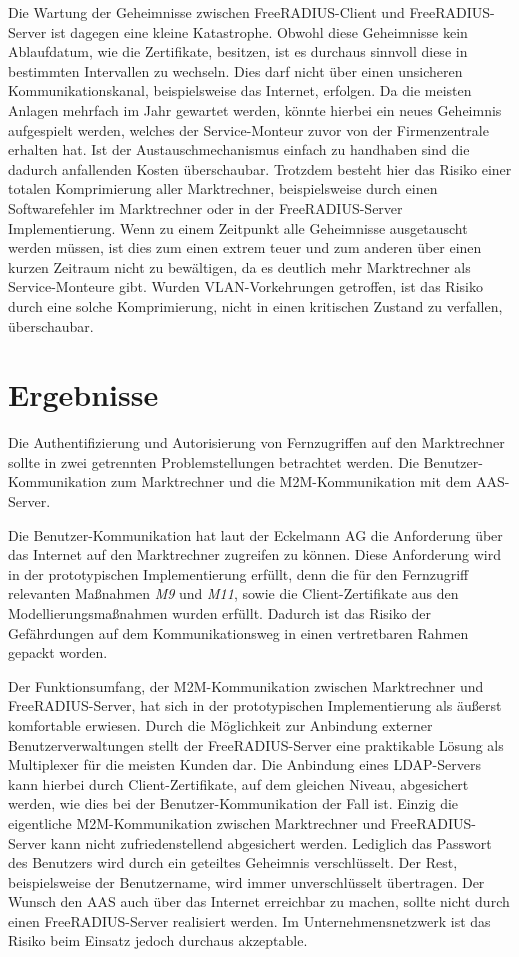 \documentclass[11pt,a4paper]{report}
\begin{document}
Die Wartung der Geheimnisse zwischen FreeRADIUS-Client und FreeRADIUS-Server ist dagegen eine kleine Katastrophe. Obwohl diese Geheimnisse kein Ablaufdatum, wie die Zertifikate, besitzen, ist es durchaus sinnvoll diese in bestimmten Intervallen zu wechseln. Dies darf nicht über einen unsicheren Kommunikationskanal, beispielsweise das Internet, erfolgen. Da die meisten Anlagen mehrfach im Jahr gewartet werden, könnte hierbei ein neues Geheimnis aufgespielt werden, welches der Service-Monteur zuvor von der Firmenzentrale erhalten hat. Ist der Austauschmechanismus einfach zu handhaben sind die dadurch anfallenden Kosten überschaubar. Trotzdem besteht hier das Risiko einer totalen Komprimierung aller Marktrechner, beispielsweise durch einen Softwarefehler im Marktrechner oder in der FreeRADIUS-Server Implementierung. Wenn zu einem Zeitpunkt alle Geheimnisse ausgetauscht werden müssen, ist dies zum einen extrem teuer und zum anderen über einen kurzen Zeitraum nicht zu bewältigen, da es deutlich mehr Marktrechner als Service-Monteure gibt. Wurden VLAN-Vorkehrungen getroffen, ist das Risiko durch eine solche Komprimierung, nicht in einen kritischen Zustand zu verfallen, überschaubar.

\section{Ergebnisse}

Die Authentifizierung und Autorisierung von Fernzugriffen auf den Marktrechner sollte in zwei getrennten Problemstellungen betrachtet werden. Die Benutzer-Kommunikation zum Marktrechner und die M2M-Kommunikation mit dem AAS-Server. 

Die Benutzer-Kommunikation hat laut der Eckelmann AG die Anforderung über das Internet auf den Marktrechner zugreifen zu können. Diese Anforderung wird in der prototypischen Implementierung erfüllt, denn die für den Fernzugriff relevanten Maßnahmen \textit{M9} und \textit{M11}, sowie die Client-Zertifikate aus den Modellierungsmaßnahmen wurden erfüllt. Dadurch ist das Risiko der Gefährdungen auf dem Kommunikationsweg in einen vertretbaren Rahmen gepackt worden.

Der Funktionsumfang, der M2M-Kommunikation zwischen Marktrechner und FreeRADIUS-Server, hat sich in der prototypischen Implementierung als äußerst komfortable erwiesen. Durch die Möglichkeit zur Anbindung externer Benutzerverwaltungen stellt der FreeRADIUS-Server eine praktikable Lösung als Multiplexer für die meisten Kunden dar. Die Anbindung eines LDAP-Servers kann hierbei durch Client-Zertifikate, auf dem gleichen Niveau, abgesichert werden, wie dies bei der Benutzer-Kommunikation der Fall ist. Einzig die eigentliche M2M-Kommunikation zwischen Marktrechner und FreeRADIUS-Server kann nicht zufriedenstellend abgesichert werden. Lediglich das Passwort des Benutzers wird durch ein geteiltes Geheimnis verschlüsselt. Der Rest, beispielsweise der Benutzername, wird immer unverschlüsselt übertragen. Der Wunsch den AAS auch über das Internet erreichbar zu machen, sollte nicht durch einen FreeRADIUS-Server realisiert werden. Im Unternehmensnetzwerk ist das Risiko beim Einsatz jedoch durchaus akzeptable.
\end{document}
